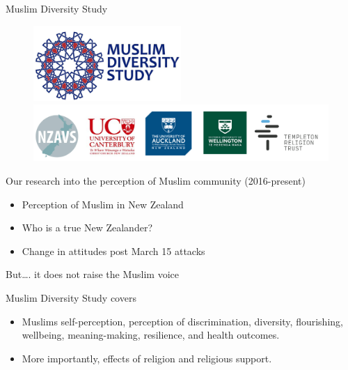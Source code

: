 \documentclass[
  ignorenonframetext,
  aspectratio=169,
]{beamer}
\providecommand{\tightlist}{%
  \setlength{\itemsep}{0pt}\setlength{\parskip}{0pt}}\usepackage{longtable,booktabs,array}
\begin{document}
\begin{frame}{Muslim Diversity Study}
\label{muslim-diversity-study}
\begin{figure}

\begin{minipage}{\linewidth}
\begin{center}
\includegraphics[width=0.5\textwidth,height=\textheight]{mds.png}
\end{center}
\end{minipage}%
\newline
\begin{minipage}{\linewidth}
\includegraphics{sponsors.png}\end{minipage}%

\end{figure}%
\end{frame}

\begin{frame}{Our research into the perception of Muslim community
(2016-present)}
\label{our-research-into-the-perception-of-muslim-community-2016-present}
\begin{itemize}[<+->]
\tightlist
\item
  Perception of Muslim in New Zealand
\item
  Who is a true New Zealander?
\item
  Change in attitudes post March 15 attacks
\end{itemize}
\end{frame}

\begin{frame}{But\ldots. it does not raise the Muslim voice}
\label{but.-it-does-not-raise-the-muslim-voice}
\end{frame}

\begin{frame}{Muslim Diversity Study covers}
\label{muslim-diversity-study-covers}
\begin{itemize}[<+->]
\tightlist
\item
  Muslims self-perception, perception of discrimination, diversity,
  flourishing, wellbeing, meaning-making, resilience, and health
  outcomes.
\item
  More importantly, effects of religion and religious support.
\end{itemize}
\end{frame}
\end{document}
